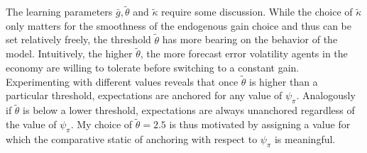 \documentclass[11pt]{article}
\renewcommand{\[}{\begin{equation}}
\renewcommand{\]}{\end{equation}}
\begin{document}
The learning parameters $\bar{g}, \tilde{\theta}$ and $\tilde{\kappa}$ require some discussion. While the choice of $\tilde{\kappa}$ only matters for the smoothness of the endogenous gain choice and thus can be set relatively freely, the threshold $\tilde{\theta}$ has more bearing on the behavior of the model. Intuitively, the higher $\tilde{\theta}$, the more forecast error volatility agents in the economy are willing to tolerate before switching to a constant gain. Experimenting with different values reveals that once $\tilde{\theta}$ is higher than a particular threshold, expectations are anchored for any value of $\psi_{\pi}$. Analogously if $\tilde{\theta}$ is below a lower threshold, expectations are always unanchored regardless of the value of $\psi_{\pi}$. My choice of $\tilde{\theta}=2.5$ is thus motivated by assigning a value for which the comparative static of anchoring with respect to $\psi_{\pi}$ is meaningful. 
\end{document}
